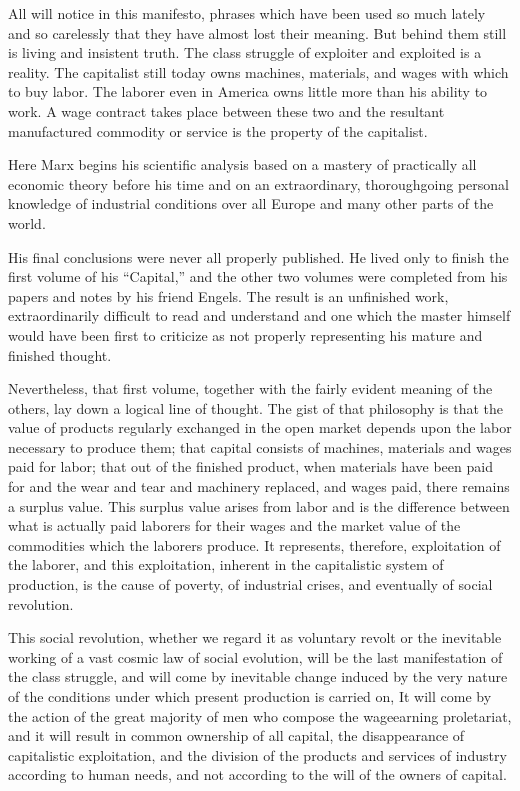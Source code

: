 \documentclass[letterpaper,10pt,english]{jupyterBook}
\begin{document}
\sphinxAtStartPar
All will notice in this manifesto, phrases which have been used so much lately and so carelessly that they have almost lost their meaning. But behind them still is living and insistent truth. The class struggle of exploiter and exploited is a reality. The capitalist still today owns machines, materials, and wages with which to buy labor. The laborer even in America owns little more than his ability to work. A wage contract takes place between these two and the resultant manufactured commodity or service is the property of the capitalist.

\sphinxAtStartPar
Here Marx begins his scientific analysis based on a mastery of practically all economic theory before his time and on an extraordinary, thoroughgoing personal knowledge of industrial conditions over all Europe and many other parts of the world.

\sphinxAtStartPar
His final conclusions were never all properly published. He lived only to finish the first volume of his “Capital,” and the other two volumes were completed from his papers and notes by his friend Engels. The result is an unfinished work, extraordinarily difficult to read and understand and one which the master himself would have been first to criticize as not properly representing his mature and finished thought.

\sphinxAtStartPar
Nevertheless, that first volume, together with the fairly evident meaning of the others, lay down a logical line of thought. The gist of that philosophy is that the value of products regularly exchanged in the open market depends upon the labor necessary to produce them; that capital consists of machines, materials and wages paid for labor; that out of the finished product, when materials have been paid for and the wear and tear and machinery replaced, and wages paid, there remains a surplus value. This surplus value arises from labor and is the difference between what is actually paid laborers for their wages and the market value of the commodities which the laborers produce. It represents, therefore, exploitation of the laborer, and this exploitation, inherent in the capitalistic system of production, is the cause of poverty, of industrial crises, and eventually of social revolution.

\sphinxAtStartPar
This social revolution, whether we regard it as voluntary revolt or the inevitable working of a vast cosmic law of social evolution, will be the last manifestation of the class struggle, and will come by inevitable change induced by the very nature of the conditions under which present production is carried on, It will come by the action of the great majority of men who compose the wage\sphinxhyphen{}earning proletariat, and it will result in common ownership of all capital, the disappearance of capitalistic exploitation, and the division of the products and services of industry according to human needs, and not according to the will of the owners of capital.
\end{document}
